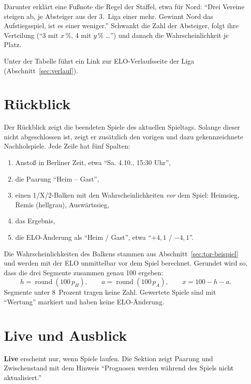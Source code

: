 Darunter erklärt eine Fußnote die Regel der Staffel, etwa für Nord:
\enquote{Drei Vereine steigen ab, je Absteiger aus der 3.~Liga einer mehr.
Gewinnt Nord das Aufstiegsspiel, ist es einer weniger.} Schwankt die Zahl
der Absteiger, folgt ihre Verteilung (\enquote{3 mit $x$\,\%, 4 mit
$y$\,\% …}) und danach die Wahrscheinlichkeit je Platz.

Unter der Tabelle führt ein Link zur ELO-Verlaufsseite der Liga
(Abschnitt~\ref{sec:verlauf}).

\section{Rückblick}

Der Rückblick zeigt die beendeten Spiele des aktuellen Spieltags. Solange
dieser nicht abgeschlossen ist, zeigt er zusätzlich den vorigen und dazu
gekennzeichnete Nachholspiele. Jede Zeile hat fünf Spalten:

\begin{enumerate}
  \item Anstoß in Berliner Zeit, etwa \enquote{Sa. 4.10., 15:30 Uhr},
  \item die Paarung \enquote{Heim – Gast},
  \item einen 1/X/2-Balken mit den Wahrscheinlichkeiten \emph{vor} dem Spiel:
        \textcolor{tinte}{Heimsieg}, \textcolor{ink3}{Remis} (hellgrau),
        \textcolor{ocker}{Auswärtssieg},
  \item das Ergebnis,
  \item die ELO-Änderung als \enquote{Heim / Gast}, etwa
        \enquote{$+4{,}1$ / $-4{,}1$}.
\end{enumerate}

Die Wahrscheinlichkeiten des Balkens stammen aus Abschnitt~\ref{sec:tor-beispiel}
und werden mit der ELO unmittelbar vor dem Spiel berechnet. Gerundet wird so,
dass die drei Segmente zusammen genau 100 ergeben:
\begin{equation}
  h = \operatorname{round}(100\,p_H), \qquad a = \operatorname{round}(100\,p_A), \qquad x = 100 - h - a.
\end{equation}
Segmente unter 8~Prozent tragen keine Zahl. Gewertete Spiele sind mit
\enquote{Wertung} markiert und haben keine ELO-Änderung.

\section{Live und Ausblick}

\textbf{Live} erscheint nur, wenn Spiele laufen. Die Sektion zeigt Paarung
und Zwischenstand mit dem Hinweis \enquote{Prognosen werden während des
Spiels nicht aktualisiert.}

